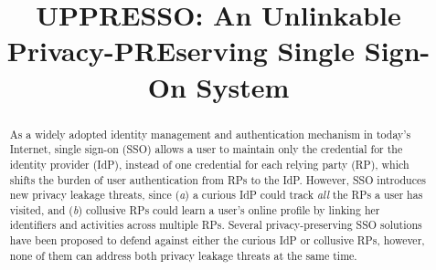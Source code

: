 \documentclass[conference, 10pt]{IEEEtran}
\theoremstyle{definition}
\begin{document}
\title{{UPPRESSO}: An Unlinkable Privacy-PREserving Single Sign-On System}
\maketitle
\begin{abstract}
As a widely adopted identity management and authentication mechanism in today's Internet, single sign-on (SSO)
allows a user to maintain only the credential for the identity provider (IdP), instead of one credential for each relying party (RP), which shifts the burden of user authentication from RPs to the IdP.
However, SSO introduces new privacy leakage threats, since (\emph{a}) a curious IdP could track {\em all} the RPs a user has visited,
and (\emph{b}) collusive RPs could learn a user's online profile by linking her identifiers and activities across multiple RPs.
Several privacy-preserving SSO solutions have been proposed to defend against either the curious IdP or collusive RPs, however, none of them can address both privacy leakage threats at the same time.


\end{abstract}
\end{document}
